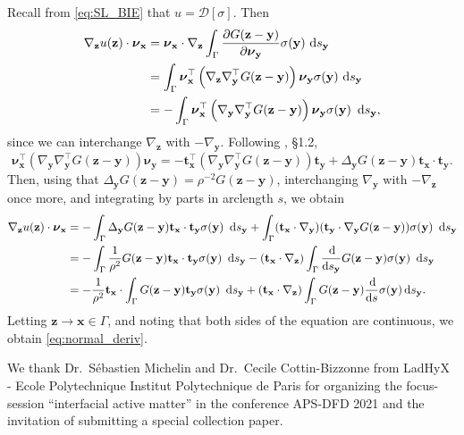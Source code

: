 \documentclass[prb,preprint,showpacs,preprintnumbers,amsmath,amssymb,longbibliography]{revtex4-1}
\newcommand{\nnu}{\boldsymbol{\nu}}
\newcommand{\xx}{\mathbf{x}}
\newcommand{\zz}{\mathbf{z}}
\newcommand{\yy}{\mathbf{y}}
\renewcommand{\tt}{\mathbf{t}}
\begin{document}
Recall from \eqref{eq:SL_BIE} that $u = \mathcal{D}[\sigma]$.
Then  
\begin{align*}
\nabla_{\zz} u(\zz) \cdot \nnu_{\xx}
&=\nnu_\xx \cdot \nabla_\zz \int_\Gamma \frac{\partial G(\zz-\yy)}{\partial \nnu_\yy}\sigma(\yy) \,\dif s_\yy\\
&=\int_\Gamma \nnu_\xx^\top \left(\nabla_\zz\nabla_\yy^\top  G(\zz-\yy)\right) \nnu_\yy\sigma(\yy)  \,\dif s_\yy\\
  &=-\int_\Gamma \nnu_\xx^\top \left(\nabla_\yy\nabla_\yy^\top G(\zz-\yy)\right)\nnu_\yy\sigma(\yy)\ \dif s_\yy,
\end{align*}
since we can interchange $\nabla_\zz$ with $-\nabla_\yy$.
Following \cite{Hsiao2008}, \S 1.2,
\[
\nnu_\xx^\top \left(\nabla_\yy\nabla_\yy^\top G(\zz-\yy)\right)\nnu_\yy
=
-\tt_{\xx}^\top \left(\nabla_\yy\nabla_\yy^\top G(\zz-\yy)\right)\tt_{\yy}
+ \Delta_{\yy}G(\zz-\yy) \tt_{\xx}\cdot \tt_{\yy}.
\]
Then, using that $\Delta_{\yy} G(\zz-\yy) = \rho^{-2} G(\zz-\yy)$,
interchanging $\nabla_\yy$ with $-\nabla_\zz$ once more,
and integrating by parts in arclength $s$,
we obtain 
\begin{align*}
\nabla_{\zz} u(\zz) \cdot \nnu_{\xx}
&=-\int_\Gamma  \Delta_\yy G(\zz-\yy) {\bf t}_\xx \cdot   {\bf t}_\yy \sigma(\yy)\ \dif s_\yy
+\int_\Gamma({\bf t}_\xx\cdot\nabla_\yy)({\bf t}_\yy\cdot\nabla_\yy G(\zz-\yy))\sigma(\yy)\ \dif s_\yy\\
&= -\int_\Gamma \frac{1}{\rho^{2}} G(\zz-\yy) {\bf t}_\xx \cdot {\bf t}_\yy \sigma(\yy)\ \dif s_\yy  
-({\bf t}_\xx\cdot\nabla_\zz)\int_\Gamma \frac{\dif}{\dif s_\yy}G(\zz-\yy) \sigma(\yy)\ \dif s_\yy\\
&= -\frac{1}{\rho^2} {\bf t}_\xx\cdot \int_\Gamma G(\zz-\yy){\bf t}_\yy \sigma(\yy)\ \dif s_\yy + 
({\bf t}_\xx \cdot \nabla_\zz)\int_\Gamma G(\zz-\yy)\frac{\dif }{\dif s} \sigma(\yy)  \dif s_\yy.
\end{align*}
%
Letting $\zz\to\xx\in\Gamma$, and noting that both sides of the equation are continuous,
we obtain \eqref{eq:normal_deriv}.


\begin{acknowledgments}
We thank Dr.~S\'ebastien Michelin and Dr.~Cecile Cottin-Bizzonne from LadHyX - Ecole Polytechnique Institut Polytechnique de Paris for organizing the focus-session ``interfacial active matter'' in the conference APS-DFD 2021 and the invitation of submitting a special collection paper. 

\end{acknowledgments}




\end{document}
